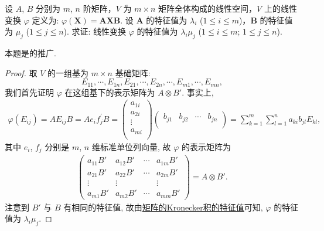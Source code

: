 \documentclass[../../main.tex]{subfiles}%
\begin{document}
\begin{proposition}\label{proposition:线性变换AXB的特征值}
设 $A$, $B$ 分别为 $m$, $n$ 阶矩阵，$V$ 为 $m\times n$ 矩阵全体构成的线性空间，$V$ 上的线性变换 $\varphi$ 定义为: $\varphi(\boldsymbol{X}) = \boldsymbol{A}\boldsymbol{X}\boldsymbol{B}$. 设 $\boldsymbol{A}$ 的特征值为 $\lambda_i$ ($1\leqslant  i\leqslant  m$)，$\boldsymbol{B}$ 的特征值为 $\mu_j$ ($1\leqslant  j\leqslant  n$). 求证: 线性变换 $\varphi$ 的特征值为 $\lambda_i\mu_j$ ($1\leqslant  i\leqslant  m$; $1\leqslant  j\leqslant  n$). 
\end{proposition}
\begin{remark}
本题是的推广.
\end{remark}
\begin{proof}
取 $V$ 的一组基为 $m\times n$ 基础矩阵:
\[
E_{11},\cdots,E_{1n},E_{21},\cdots,E_{2n},\cdots,E_{m1},\cdots,E_{mn},
\]
我们首先证明 $\varphi$ 在这组基下的表示矩阵为 $A\otimes B'$. 事实上,
\begin{align*}
\varphi (E_{ij})=AE_{ij}B=Ae_if_{j}^{\prime}B=\left( \begin{array}{c}
a_{1i}\\
a_{2i}\\
\vdots\\
a_{mi}\\
\end{array} \right) \left( \begin{matrix}
b_{j1}&		b_{j2}&		\cdots&		b_{jn}\\
\end{matrix} \right) =\sum_{k=1}^m{\sum_{l=1}^n{a_{ki}b_{jl}E_{kl},}}
\end{align*}
其中 $e_{i}$, $f_{j}$ 分别是 $m$, $n$ 维标准单位列向量, 故 $\varphi$ 的表示矩阵为
\begin{align*}
\begin{pmatrix}
a_{11}B' & a_{12}B' & \cdots & a_{1m}B' \\
a_{21}B' & a_{22}B' & \cdots & a_{2m}B' \\
\vdots & \vdots & & \vdots \\
a_{m1}B' & a_{m2}B' & \cdots & a_{mm}B'
\end{pmatrix}=A\otimes B'.
\end{align*}
注意到 $B'$ 与 $B$ 有相同的特征值, 故由\hyperref[proposition:矩阵的Kronecker积的特征值]{矩阵的Kronecker积的特征值}可知, $\varphi$ 的特征值为 $\lambda_{i}\mu_{j}$.
\end{proof}
\end{document}
